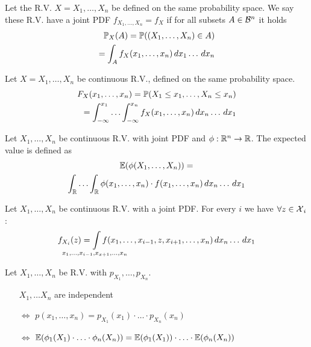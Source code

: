 \pagebreak
\begin{cdefinition*}
  Let the R.V. \(X = X_1, \ldots, X_n\) be defined on the same probability space. We say these R.V. have a joint PDF \(f_{X_1, \ldots, X_n} = f_X\) if for all subsets \(A \in \B^n\) it holds
  \begin{align*}
    \P_X(A) = \P((X_1, \ldots, X_n) \in A) \\
    = \int_A f_X(x_1, \ldots, x_n) \, dx_1 \ldots \,dx_n
  \end{align*}
\end{cdefinition*}

\begin{cdefinition*}
  Let \(X = X_1, \ldots, X_n\) be continuous R.V., defined on the same probability space.
  \begin{align*}
    F_{X}(x_1, \ldots, x_n) = \P(X_1 \leq x_1, \ldots, X_n \leq x_n) \\
    = \int_{-\infty}^{x_1} \ldots \int_{-\infty}^{x_n} f_{X}(x_1, \ldots, x_n) \,dx_n \ldots \, dx_1
  \end{align*}
\end{cdefinition*}

\begin{proposition}
  Let \(X_1, \ldots, X_n\) be continuous R.V. with joint PDF and \(\phi: \R^n \to \R\). The expected value is defined as
  \begin{multline*}
    \E(\phi(X_1, \ldots, X_n)) = \\ \int_\R \ldots \int_\R \phi(x_1, \ldots, x_n) \cdot f(x_1, \ldots, x_n) \, dx_n \ldots \, dx_1
  \end{multline*}
\end{proposition}

\begin{ctheorem*}
  Let \(X_1, \ldots, X_n\) be continuous R.V. with a joint PDF. For every \(i\) we have \(\forall z \in \DX_i\):
  \[f_{X_i}(z) = \smashoperator{\int_{x_1, \ldots, x_{i-1}, x_{x+1}, \ldots, x_n}} f(x_1, \ldots, x_{i-1}, z, x_{i+1}, \ldots, x_n) \, dx_n \ldots \, dx_1\]
\end{ctheorem*}

\begin{theorem*}
  Let \(X_1, \ldots, X_n\) be R.V. with \(p_{X_1}, \ldots, p_{X_n}\).
  \begin{itemize}
    \item[] \(X_1, \ldots X_n\) are independent
    \item[\(\Leftrightarrow\)] \(p(x_1, \ldots, x_n) = p_{X_1}(x_1) \cdot \ldots \cdot p_{X_n}(x_n)\)
    \item[\(\Leftrightarrow\)] \(\E(\phi_1(X_1) \cdot \ldots \cdot \phi_n(X_n)) = \E(\phi_1(X_1)) \cdot \ldots \cdot \E(\phi_n(X_n))\)
  \end{itemize}
\end{theorem*}


